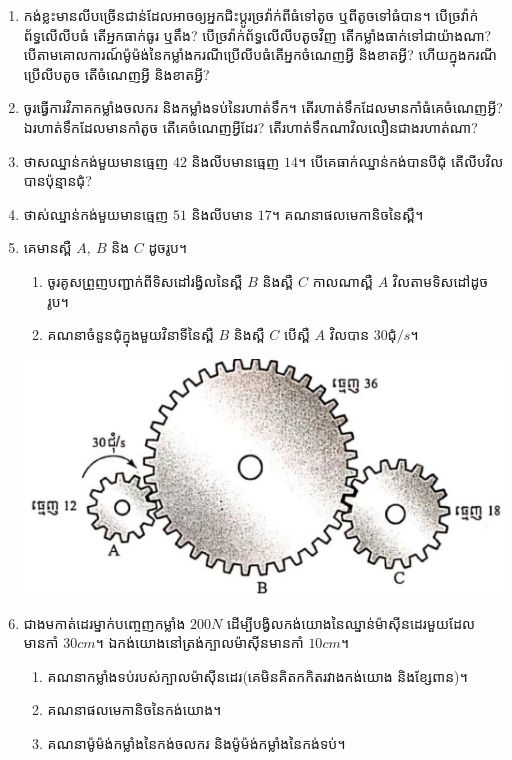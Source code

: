 \documentclass{officialexam}
\begin{document}
\begin{enumerate}[m]
	\item កង់ខ្លះមានលីបច្រើនជាន់ដែលអាចឲ្យអ្នកជិះប្តូរច្រវ៉ាក់ពីធំទៅតូច ឬពីតូចទៅធំបាន។ បើច្រវ៉ាក់ព័ទ្ធលើលីបធំ តើអ្នកធាក់ធូរ ឬតឹង? បើច្រវ៉ាក់ព័ទ្ធលើលីបតូចវិញ តើកម្លាំងធាក់ទៅជាយ៉ាងណា? បើតាមគោលការណ៍ម៉ូម៉ង់នៃកម្លាំងករណីប្រើលីបធំតើអ្នកចំណេញអ្វី និងខាតអ្វី? ហើយក្នុងករណីប្រើលីបតូច តើចំណេញអ្វី និងខាតអ្វី?
	\item ចូរធ្វើការវិភាគកម្លាំងចលករ និងកម្លាំងទប់នៃរហាត់ទឹក។ តើរហាត់ទឹកដែលមានកាំធំគេចំណេញអ្វី? ឯរហាត់ទឹកដែលមានកាំតូច តើគេចំណេញអ្វីដែរ? តើរហាត់ទឹកណាវិលលឿនជាងរហាត់ណា?
	\item ថាសឈ្នាន់កង់មួយមានធ្មេញ $42$ និងលីបមានធ្មេញ $14$។ បើគេធាក់ឈ្នាន់កង់បានបីជុំ តើលីបវិលបានប៉ុន្មានជុំ?
	\item ថាស់ឈ្នាន់កង់មួយមានធ្មេញ $51$ និងលីបមាន $17$។ គណនាផលមេកានិចនៃស្ពឺ។
	\item គេមានស្ពឺ $A,~B$ និង $C$ ដូចរូប។
	\begin{multicols}{2}
		\begin{enumerate}[k]
			\item ចូរគូសព្រួញបញ្ជាក់ពីទិសដៅរង្វិលនៃស្ពឺ $B$ និងស្ពឺ $C$ កាលណាស្ពឺ $A$ វិលតាមទិសដៅដូចរូប។
			\item គណនាចំនួនជុំក្នុងមួយវិនាទីនៃស្ពឺ $B$ និងស្ពឺ $C$ បើស្ពឺ $A$ វិលបាន $30\text{ជុំ}/s$។
		\end{enumerate}
		\includegraphics[scale=0.2]{16}
	\end{multicols}
	\item ជាងមកាត់ដេរម្នាក់បញ្ចេញកម្លាំង $200N$ ដើម្បីបង្វិលកង់យោងនៃឈ្នាន់ម៉ាសុីនដេរមួយដែលមានកាំ $30cm$។ ឯកង់យោងនៅត្រង់ក្បាលម៉ាសុីនមានកាំ $10cm$។
	\begin{enumerate}[k]
		\item គណនាកម្លាំងទប់របស់ក្បាលម៉ាសុីនដេរ(គេមិនគិតកកិតរវាងកង់យោង និងខ្សែពាន)។
		\item គណនាផលមេកានិចនៃកង់យោង។
		\item គណនាម៉ូម៉ង់កម្លាំងនៃកង់ចលករ និងម៉ូម៉ង់កម្លាំងនៃកង់ទប់។
	\end{enumerate}
\end{enumerate}
\end{document}
